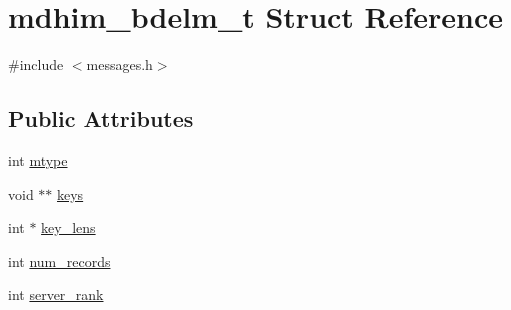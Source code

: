 \hypertarget{structmdhim__bdelm__t}{\section{mdhim\-\_\-bdelm\-\_\-t Struct Reference}
\label{d4/ddf/structmdhim__bdelm__t}
}


{\ttfamily \#include $<$messages.\-h$>$}

\subsection*{Public Attributes}
\begin{DoxyCompactItemize}
\item 
int \hyperlink{structmdhim__bdelm__t_a9723fe671281596fa43c80b13ea7eb9c}{mtype}
\item 
void $\ast$$\ast$ \hyperlink{structmdhim__bdelm__t_a7e218a41a470e47c65040491f879985d}{keys}
\item 
int $\ast$ \hyperlink{structmdhim__bdelm__t_a12057b9c3f79456910521cd628b31415}{key\-\_\-lens}
\item 
int \hyperlink{structmdhim__bdelm__t_a3a51d42f3dee8ffd91aa208cdd2be0a3}{num\-\_\-records}
\item 
int \hyperlink{structmdhim__bdelm__t_a5c455aeb5d7804c4d448d5b3f624c6e6}{server\-\_\-rank}
\end{DoxyCompactItemize}


